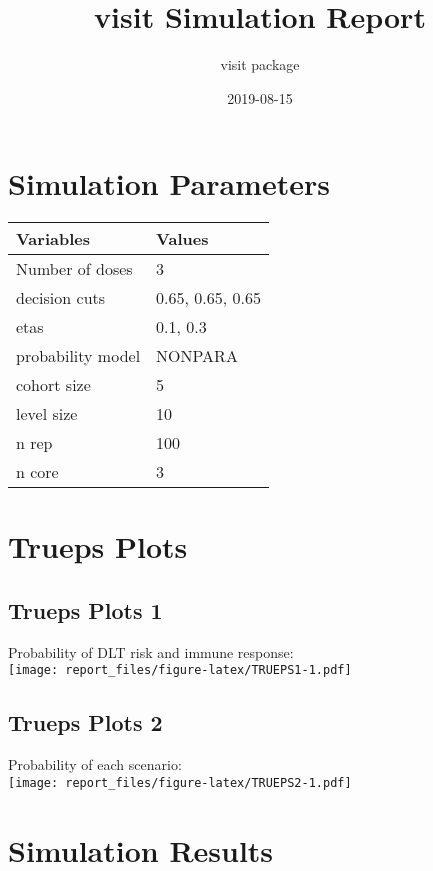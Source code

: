 \documentclass[]{article}
\title{visit Simulation Report}
\author{visit package}
\date{2019-08-15}
\begin{document}
\maketitle

{
\setcounter{tocdepth}{3}
\tableofcontents
}
\clearpage

\hypertarget{simulation-parameters}{%
\section{Simulation Parameters}\label{simulation-parameters}}

\begin{longtable}[]{@{}ll@{}}
\toprule
Variables & Values\tabularnewline
\midrule
\endhead
Number of doses & 3\tabularnewline
decision cuts & 0.65, 0.65, 0.65\tabularnewline
etas & 0.1, 0.3\tabularnewline
probability model & NONPARA\tabularnewline
cohort size & 5\tabularnewline
level size & 10\tabularnewline
n rep & 100\tabularnewline
n core & 3\tabularnewline
\bottomrule
\end{longtable}

\clearpage

\hypertarget{trueps-plots}{%
\section{Trueps Plots}\label{trueps-plots}}

\hypertarget{trueps-plots-1}{%
\subsection{Trueps Plots 1}\label{trueps-plots-1}}

Probability of DLT risk and immune response:\\
\texttt{[image: report\_files/figure-latex/TRUEPS1-1.pdf]}

\clearpage

\hypertarget{trueps-plots-2}{%
\subsection{Trueps Plots 2}\label{trueps-plots-2}}

Probability of each scenario:\\
\texttt{[image: report\_files/figure-latex/TRUEPS2-1.pdf]}

\clearpage

\hypertarget{simulation-results}{%
\section{Simulation Results}\label{simulation-results}}
\end{document}
